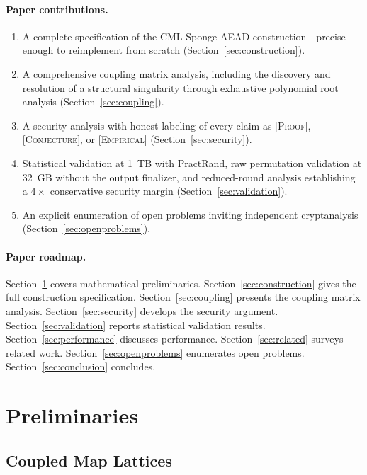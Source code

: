 \documentclass[runningheads]{llncs}
\begin{document}
\paragraph{Paper contributions.}
\begin{enumerate}[nosep]
\item A complete specification of the CML-Sponge AEAD construction---precise
  enough to reimplement from scratch (Section~\ref{sec:construction}).
\item A comprehensive coupling matrix analysis, including the discovery and
  resolution of a structural singularity through exhaustive polynomial root
  analysis (Section~\ref{sec:coupling}).
\item A security analysis with honest labeling of every claim as \textsc{[Proof]},
  \textsc{[Conjecture]}, or \textsc{[Empirical]} (Section~\ref{sec:security}).
\item Statistical validation at 1~TB with PractRand, raw permutation validation
  at 32~GB without the output finalizer, and reduced-round analysis
  establishing a $4\times$ conservative security margin (Section~\ref{sec:validation}).
\item An explicit enumeration of open problems inviting independent
  cryptanalysis (Section~\ref{sec:openproblems}).
\end{enumerate}

\paragraph{Paper roadmap.}
Section~\ref{sec:prelim} covers mathematical preliminaries.
Section~\ref{sec:construction} gives the full construction specification.
Section~\ref{sec:coupling} presents the coupling matrix analysis.
Section~\ref{sec:security} develops the security argument.
Section~\ref{sec:validation} reports statistical validation results.
Section~\ref{sec:performance} discusses performance.
Section~\ref{sec:related} surveys related work.
Section~\ref{sec:openproblems} enumerates open problems.
Section~\ref{sec:conclusion} concludes.

\section{Preliminaries}
\label{sec:prelim}

\subsection{Coupled Map Lattices}
\end{document}
